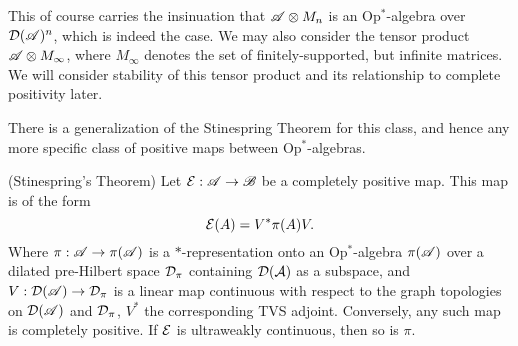\documentclass[../main.tex]{subfiles}
\begin{document}
This of course carries the insinuation that $\mathscr{A} \otimes M_n$ is an Op$^*$-algebra over $\mathcal{D}(\mathscr{A})^n$, which is indeed
the case.
We may also consider the tensor product $\mathscr{A} \otimes M_\infty$, where $M_\infty$ denotes the set of finitely-supported,
but infinite matrices. We will consider stability of this tensor product and its relationship to complete positivity later.

There is a generalization of the Stinespring Theorem for this class, and hence any more specific class of positive maps between
Op$^*$-algebras.

\begin{theorem}

	(Stinespring's Theorem) Let $\mathcal{E}: \mathscr{A} \to \mathscr{B}$ be a completely positive map. This map is of the form
	\[\mathcal{E}(A) = V^*\pi(A)V.\] Where $\pi: \mathscr{A} \to \pi(\mathscr{A})$ is a $*$-representation onto an Op$^*$-algebra 
	$\pi(\mathscr{A})$ over a dilated pre-Hilbert space $\mathcal{D}_\pi$ containing $\mathcal{D}(\mathcal{A})$ as a subspace, and 
	$V:\mathcal{D}(\mathscr{A}) \to \mathcal{D}_\pi$ is a linear map continuous with respect to the graph topologies on $\mathcal{D}(\mathscr{A})$
	and $\mathcal{D}_\pi$, $V^*$ the corresponding TVS adjoint. Conversely, any such map is completely positive. If $\mathcal{E}$ is 
	ultraweakly continuous, then so is $\pi$.

\end{theorem}
\end{document}
